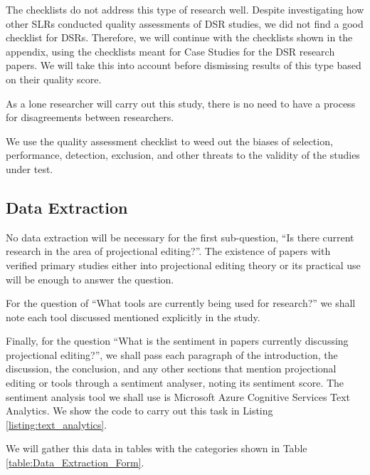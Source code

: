 The checklists do not address this type of research well.
Despite investigating how other SLRs conducted quality assessments of DSR studies, we did not find a good checklist for DSRs.
Therefore, we will continue with the checklists shown in the appendix, using the checklists meant for Case Studies for the DSR research papers.
We will take this into account before dismissing results of this type based on their quality score.

As a lone researcher will carry out this study, there is no need to have a process for disagreements between researchers.

We use the quality assessment checklist to weed out the biases of selection, performance, detection, exclusion, and other threats to the validity of the studies under test.


\subsection{Data Extraction}
\label{section:dataExtraction}
No data extraction will be necessary for the first sub-question,  ``Is there current research in the area of projectional editing?''.
The existence of papers with verified primary studies either into projectional editing theory or its practical use will be enough to answer the question.

For the question of ``What tools are currently being used for research?'' we shall note each tool discussed mentioned explicitly in the study.

Finally, for the question ``What is the sentiment in papers currently discussing projectional editing?'', we shall pass each paragraph of the introduction, the discussion, the conclusion, and any other sections that mention projectional editing or tools through a sentiment analyser, noting its sentiment score.
The sentiment analysis tool we shall use is Microsoft Azure Cognitive Services Text Analytics.
We show the code to carry out this task in Listing \ref{listing:text_analytics}.

We will gather this data in tables with the categories shown in Table \ref{table:Data_Extraction_Form}.

